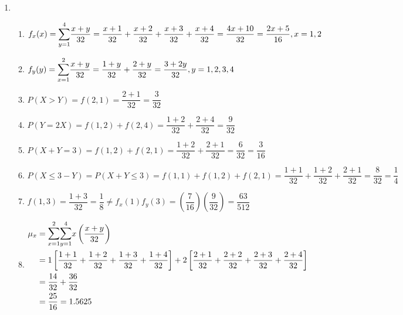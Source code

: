 \documentclass{article}
\newcommand\mfrac[2]{\left(\dfrac{#1}{#2}\right)}
\begin{document}
\begin{enumerate}
     \item
      \begin{enumerate}
       \item 
	$f_x(x) = \mathlarger{\sum}_{y=1}^4{\dfrac{x+y}{32} = \dfrac{x+1}{32} + \dfrac{x+2}{32}
	  +\dfrac{x+3}{32} + \dfrac{x+4}{32}} = \dfrac{4x+10}{32} = \dfrac{2x+5}{16}, x=1,2$
       
       \item 
	$f_y(y) = \mathlarger{\sum}_{x=1}^2{\dfrac{x+y}{32}} = \dfrac{1+y}{32} + \dfrac{2+y}{32}
	  = \dfrac{3+2y}{32}, y=1,2,3,4$
       
       \item 
	$P(X > Y) = f(2,1) = \dfrac{2+1}{32} = \dfrac{3}{32}$
       
       \item 
	$P(Y = 2X) = f(1,2) + f(2,4) = \dfrac{1+2}{32} + \dfrac{2+4}{32} = \dfrac{9}{32}$
       
       \item 
	$P(X + Y = 3) = f(1,2) + f(2,1) = \dfrac{1+2}{32} + \dfrac{2+1}{32} = \dfrac{6}{32} = \dfrac{3}{16}$
       
       \item 
	$P(X \le 3 - Y) = P(X + Y \le 3) = f(1,1) + f(1,2) + f(2,1) = \dfrac{1+1}{32} + \dfrac{1+2}{32}
	  + \dfrac{2+1}{32} = \dfrac{8}{32} = \dfrac{1}{4}$
       
       \item 
	$f(1,3) = \dfrac{1+3}{32} = \dfrac{1}{8} \neq f_x(1)f_y(3) 
	      = \mfrac{7}{16}\mfrac{9}{32} = \dfrac{63}{512}$
       
       \item 
	\begin{align*}
	 \mu_x &= \mathlarger{\sum}_{x=1}^2 \mathlarger{\sum}_{y=1}^4 {x\mfrac{x+y}{32}} \\
	  &= 1\left[\dfrac{1+1}{32} + \dfrac{1+2}{32} + \dfrac{1+3}{32} + \dfrac{1+4}{32}\right]
	    + 2\left[\dfrac{2+1}{32} + \dfrac{2+2}{32} + \dfrac{2+3}{32} + \dfrac{2+4}{32}\right] \\
	  &= \dfrac{14}{32} + \dfrac{36}{32} \\
	  &= \dfrac{25}{16} = 1.5625 
	\end{align*}
	

\end{enumerate}
\end{enumerate}
\end{document}
